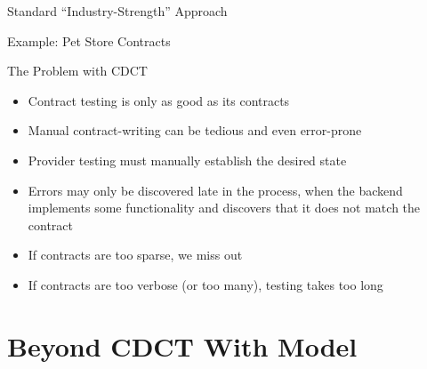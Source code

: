 \begin{frame}[fragile]{Standard ``Industry-Strength'' Approach}

\end{frame}

\begin{frame}[fragile]{Example: Pet Store Contracts}



\end{frame}

\begin{frame}[fragile]{The Problem with CDCT}

\begin{itemize}[<+->]
\item Contract testing is only as good as its contracts
\item Manual contract-writing can be tedious and even error-prone
\item Provider testing must manually establish the desired state
\item Errors may only be discovered late in the process, when the backend implements some functionality and discovers that it does not match the contract
\item If contracts are too sparse, we miss out
\item If contracts are too verbose (or too many), testing takes too long
\end{itemize}

\end{frame}

\part{Beyond CDCT With Model}

